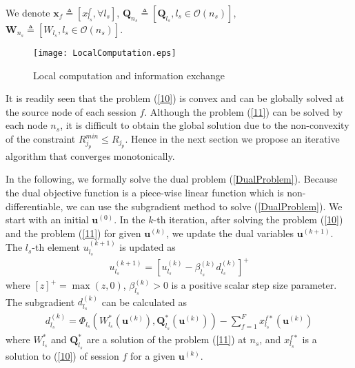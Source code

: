 \documentclass[12pt,onecolumn,tworows]{IEEEtran}
\begin{document}
We denote $\mathbf{x}_f \triangleq [x_{l_s}^f,\forall l_s]$, $\mathbf{Q}_{n_s} \triangleq [\mathbf{Q}_{l_s},l_s\in\mathcal{O}(n_s)]$, $\mathbf{W}_{n_s} \triangleq [W_{l_s},l_s\in\mathcal{O}(n_s)]$.




\begin{figure*}[t]
\centering
\texttt{[image: LocalComputation.eps]}
\caption{Local computation and information exchange}
\label{fig:fig1A}
\end{figure*}


 It is readily seen that the problem (\ref{10}) is convex and can be globally solved at the source node of each session $f$. Although the problem (\ref{11}) can be solved by each node $n_s$, it is difficult to obtain the global solution due to the non-convexity of the constraint $R_{{j_p}}^{min} \leqslant {{ R}_{{j_p}}}$. Hence in the next section we propose an iterative algorithm that converges monotonically.

In the following, we formally solve the dual problem (\ref{DualProblem}). Because the dual objective function is a piece-wise linear function which is non-differentiable, we can use the subgradient method to solve (\ref{DualProblem})\cite{boydcvbook}.
We start with an initial ${{\mathbf{u}}^{(0)}}$. In the $k$-th iteration, after solving the problem (\ref{10}) and the problem (\ref{11}) for given ${{\mathbf{u}}^{(k)}}$, we update the dual variables ${{\mathbf{u}}^{(k + 1)}}$. The $l_s$-th element  $u_{l_s}^{(k + 1)}$ is updated as
\begin{equation}\label{12}
\begin{gathered}
u_{l_s}^{(k + 1)} = {\left[ {{{u_{l_s}^{(k)} - {\beta_{l_s}^{(k)}}{d_{l_s}^{(k)}}}}} \right]^ + }
\end{gathered}
\end{equation}
where $[z]^{+}=\max(z,0)$, ${\beta_{l_s}^{(k)}}>0$ is a positive scalar step size parameter.
The subgradient $d_{l_s}^{(k)}$ can be calculated as
\begin{equation}\label{15}
\begin{gathered}
d_{{l_s}}^{(k)} = {\Phi _{{l_s}}}({{W}_{l_s}^*}({\mathbf{u}^{(k)}}),{{\mathbf{Q}}_{l_s}^*}({\mathbf{u}^{(k)}})) - \sum\limits_{f=1}^F x_{l_s}^{f*}({\mathbf{u}^{(k)}})
\end{gathered}
\end{equation}
where $W_{l_s}^{*}$ and $\mathbf{Q}_{l_s}^{*}$ are
a solution of the problem (\ref{11}) at $n_s$, and $x_{l_s}^{f*}$ is a solution to (\ref{10}) of session $f$ for a given $\mathbf{u}^{(k)}$.
\end{document}
